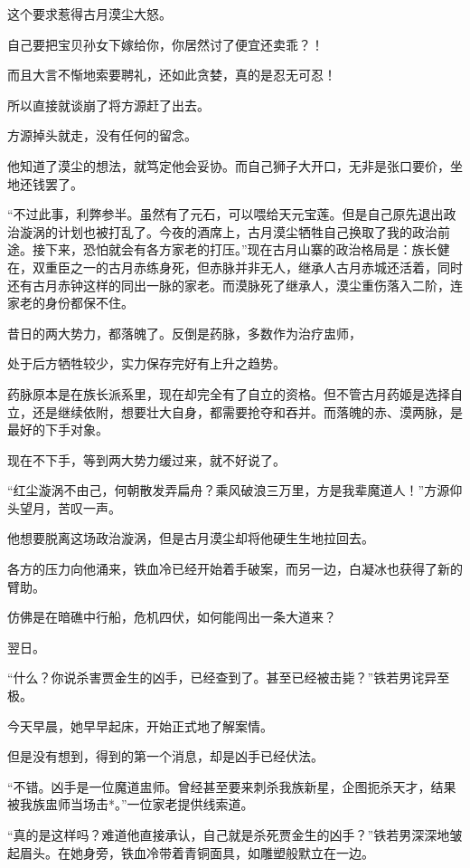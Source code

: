 \begin{this_body}
这个要求惹得古月漠尘大怒。

自己要把宝贝孙女下嫁给你，你居然讨了便宜还卖乖？！

而且大言不惭地索要聘礼，还如此贪婪，真的是忍无可忍！

所以直接就谈崩了将方源赶了出去。

方源掉头就走，没有任何的留念。

他知道了漠尘的想法，就笃定他会妥协。而自己狮子大开口，无非是张口要价，坐地还钱罢了。

“不过此事，利弊参半。虽然有了元石，可以喂给天元宝莲。但是自己原先退出政治漩涡的计划也被打乱了。今夜的酒席上，古月漠尘牺牲自己换取了我的政治前途。接下来，恐怕就会有各方家老的打压。”现在古月山寨的政治格局是：族长健在，双重臣之一的古月赤练身死，但赤脉并非无人，继承人古月赤城还活着，同时还有古月赤钟这样的同出一脉的家老。而漠脉死了继承人，漠尘重伤落入二阶，连家老的身份都保不住。

昔日的两大势力，都落魄了。反倒是药脉，多数作为治疗盅师，

处于后方牺牲较少，实力保存完好有上升之趋势。

药脉原本是在族长派系里，现在却完全有了自立的资格。但不管古月药姬是选择自立，还是继续依附，想要壮大自身，都需要抢夺和吞并。而落魄的赤、漠两脉，是最好的下手对象。

现在不下手，等到两大势力缓过来，就不好说了。

“红尘漩涡不由己，何朝散发弄扁舟？乘风破浪三万里，方是我辈魔道人！”方源仰头望月，苦叹一声。

他想要脱离这场政治漩涡，但是古月漠尘却将他硬生生地拉回去。

各方的压力向他涌来，铁血冷已经开始着手破案，而另一边，白凝冰也获得了新的臂助。

仿佛是在暗礁中行船，危机四伏，如何能闯出一条大道来？

翌日。

“什么？你说杀害贾金生的凶手，已经查到了。甚至已经被击毙？”铁若男诧异至极。

今天早晨，她早早起床，开始正式地了解案情。

但是没有想到，得到的第一个消息，却是凶手已经伏法。

“不错。凶手是一位魔道盅师。曾经甚至要来刺杀我族新星，企图扼杀天才，结果被我族盅师当场击*。”一位家老提供线索道。

“真的是这样吗？难道他直接承认，自己就是杀死贾金生的凶手？”铁若男深深地皱起眉头。在她身旁，铁血冷带着青铜面具，如雕塑般默立在一边。


\end{this_body}
